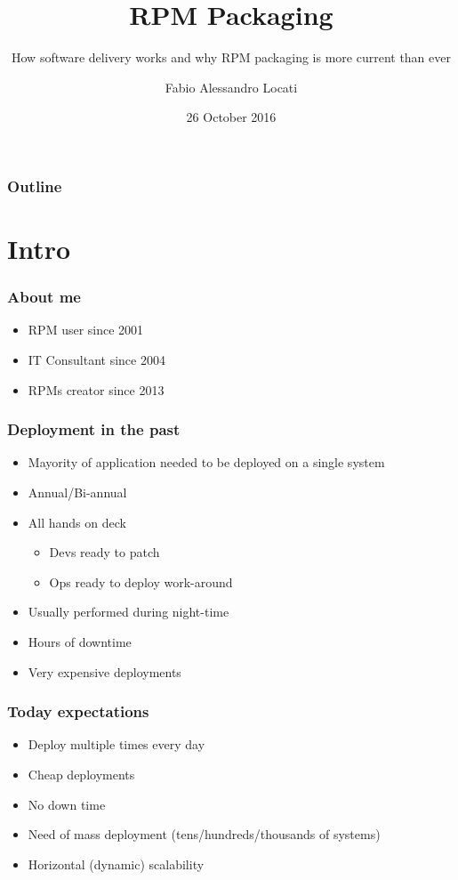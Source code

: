 \documentclass[t,aspectratio=169]{beamer}
\title{RPM Packaging}
\subtitle{How software delivery works and why RPM packaging is more current than ever}
\author{Fabio Alessandro Locati}
\date{26 October 2016}
\begin{document}
\maketitle

\begin{frame}
    \frametitle{Outline}
    \tableofcontents
\end{frame}

\section{Intro}
\begin{frame}
    \frametitle{About me}
    \begin{itemize}
        \item<2-> RPM user since 2001
        \item<3-> IT Consultant since 2004
        \item<4-> RPMs creator since 2013
    \end{itemize}
\end{frame}

\begin{frame}
    \frametitle{Deployment in the past}
    \begin{itemize}
        \item<2-> Mayority of application needed to be deployed on a single system
        \item<3-> Annual/Bi-annual
        \item<4-> All hands on deck
        \begin{itemize}
            \item<5-> Devs ready to patch
            \item<6-> Ops ready to deploy work-around
        \end{itemize}
        \item<7-> Usually performed during night-time
        \item<8-> Hours of downtime
        \item<9-> Very expensive deployments
    \end{itemize}
\end{frame}

\begin{frame}
    \frametitle{Today expectations}
    \begin{itemize}
        \item<2-> Deploy multiple times every day
        \item<3-> Cheap deployments
        \item<4-> No down time
        \item<5-> Need of mass deployment (tens/hundreds/thousands of systems)
        \item<6-> Horizontal (dynamic) scalability
    \end{itemize}
\end{frame}
\end{document}
